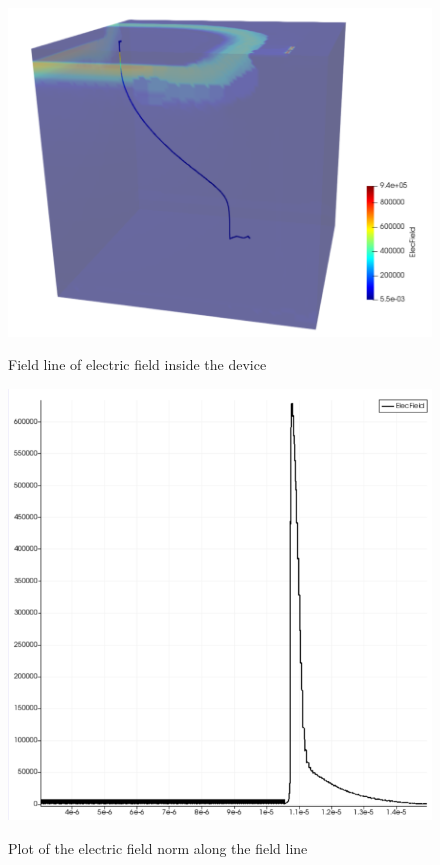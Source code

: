 \documentclass[10pt,a4paper,twocolumn]{article}
\begin{document}
\begin{figure}[h]
\caption{Field line of electric field inside the device}
\centering
\includegraphics[scale=0.4]{../pictures/SL1.png}
\label{fig:streamline1}
\end{figure}

\begin{figure}[hbtp]
\caption{Plot of the electric field norm along the field line}
\centering
\includegraphics[scale=0.45]{../pictures/ElectricField.png}
\label{fig:electricfieldplot}
\end{figure}
\end{document}
